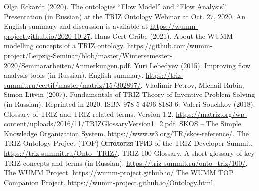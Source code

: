 \documentclass[11pt,a4paper]{article}
\begin{document}
\begin{thebibliography}{xxx}
\raggedright
{} Olga Eckardt (2020).  The ontologies “Flow Model” and
  “Flow Analysis”. Presentation (in Russian) at the TRIZ Ontology Webinar at
  Oct. 27, 2020.  An English summary and discussion is available at
  \url{https://wumm-project.github.io/2020-10-27}.
 Hans-Gert Gr\"abe (2021). About the WUMM modelling
  concepts of a TRIZ ontology.  \url{https://github.com/wumm-project/Leipzig-Seminar/blob/master/Wintersemester-2020/Seminararbeiten/Anmerkungen.pdf}.
 Yuri Lebedyev (2015). Improving flow analysis tools (in
  Russian).  English summary.
  \url{https://triz-summit.ru/certif/master/matriz/15/302897/}.
 Vladimir Petrov, Michail Rubin, Simon Litvin (2007).
  Fundamentals of TRIZ Theory of Inventive Problem Solving (in Russian).
  Reprinted in 2020. ISBN 978-5-4496-8183-6.
 Valeri Souchkov (2018).  Glossary of TRIZ and
  TRIZ-related terms. Version 1.2.
  \url{https://matriz.org/wp-content/uploads/2016/11/TRIZGlossaryVersion1_2.pdf}. 
 SKOS -- The Simple Knowledge Organization System.
  \url{https://www.w3.org/TR/skos-reference/}.  
 The TRIZ Ontology Project (TOP)
  \foreignlanguage{russian}{Онтология ТРИЗ} of the TRIZ Developer Summit.
  \url{https://triz-summit.ru/Onto_TRIZ/}.
 TRIZ 100 Glossary. A short glossary of key TRIZ
  concepts and terms (in Russian).
  \url{https://triz-summit.ru/onto_triz/100/}.
 The WUMM Project. \url{https://wumm-project.github.io/} 
 The WUMM TOP Companion Project.
  \url{https://wumm-project.github.io/Ontology.html} 
\end{thebibliography}
\end{document}
